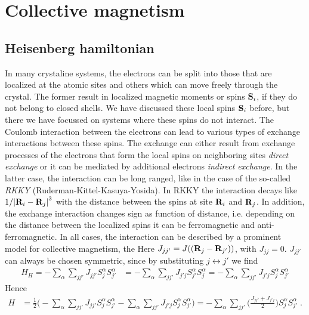 \section{Collective magnetism }

\subsection{Heisenberg hamiltonian}
In many crystaline  systems, the electrons can be split into those that are localized at the atomic sites and others which can move freely through the crystal. The former result in localized
magnetic moments or spins $\mathbf S_{i}$, if they do not belong to closed shells. 
We have discussed these  local spins $\mathbf S_{i}$ before, but there we have focussed on systems where these spins do not interact. 
The Coulomb interaction between the electrons can lead to various types of exchange interactions
between these spins. The exchange can either result from exchange processes of the electrons that form the local spins on neighboring sites {\em direct exchange} or it can be mediated by
additional electrons {\em indirect exchange}. In the latter case, the interaction can be long ranged, like in the case of the so-called {\em RKKY} (Ruderman-Kittel-Kasuya-Yosida). 
In RKKY the interaction decays like $1/\abs{\mathbf R_{i}-\mathbf R_{j}}^{3}$ with the distance between the spins at site 
$\mathbf R_{i}$ and $\mathbf R_{j}$. In addition, the exchange interaction  changes sign as function of distance, i.e.
depending on the distance between the localized spins it can be ferromagnetic and anti-ferromagnetic. In all cases, the interaction can be described by a prominent model for collective magnetism, the 
Here $J_{jj'} = J((\mathbf R_{j}-\mathbf R_{j'}))$, with $J_{jj}=0$.
 $J_{jj'}$ can always be chosen symmetric, since by substituting $j\leftrightarrow j'$ we find
%
\begin{align*}
H_{H}= -\sum_{\alpha}\sum_{jj'} J_{jj'} S^{\alpha}_{j}S^{\alpha}_{j'} &= -\sum_{\alpha}\sum_{jj'} J_{j'j} S^{\alpha}_{j'}S^{\alpha}_{j} =-\sum_{\alpha}\sum_{jj'} J_{j'j} S^{\alpha}_{j}S^{\alpha}_{j'} 
\end{align*}
%
Hence 
%
\begin{align*}
H &= \frac{1}{2}\bigg(  -\sum_{\alpha}\sum_{jj'} J_{jj'} S^{\alpha}_{j}S^{\alpha}_{j'} 
 -\sum_{\alpha}\sum_{jj'} J_{j'j} S^{\alpha}_{j}S^{\alpha}_{j'}  \bigg)=
 -\sum_{\alpha}\sum_{jj'} \bigg(\frac{J_{jj'}+J_{j'j}}{2}\bigg) S^{\alpha}_{j}S^{\alpha}_{j'} \;.
\end{align*}
